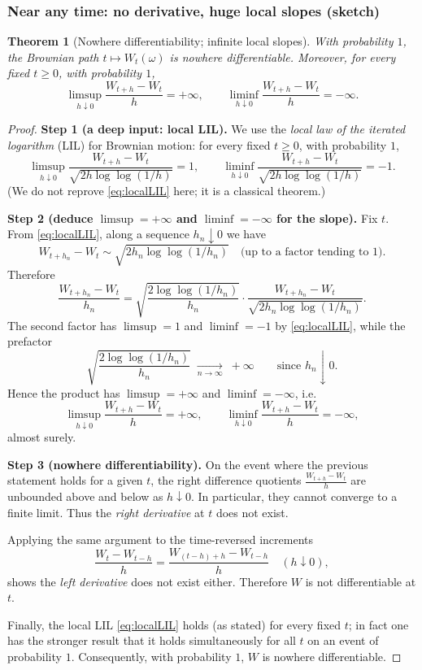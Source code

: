 \documentclass[11pt]{article}
\newtheorem{theorem}{Theorem}[section]
\theoremstyle{definition}
\theoremstyle{remark}
\begin{document}
\subsubsection{Near any time: no derivative, huge local slopes (sketch)}
\begin{theorem}[Nowhere differentiability; infinite local slopes]
With probability $1$, the Brownian path $t\mapsto W_t(\omega)$ is nowhere differentiable.
Moreover, for every fixed $t\ge 0$, with probability $1$,
\[
\limsup_{h\downarrow0}\frac{W_{t+h}-W_t}{h}=+\infty,
\qquad
\liminf_{h\downarrow0}\frac{W_{t+h}-W_t}{h}=-\infty.
\]
\end{theorem}

\begin{proof}
\textbf{Step 1 (a deep input: local LIL).}
We use the \emph{local law of the iterated logarithm} (LIL) for Brownian motion:
for every fixed $t\ge 0$, with probability $1$,
\begin{equation}\label{eq:localLIL}
\limsup_{h\downarrow0}\frac{W_{t+h}-W_t}{\sqrt{2h\log\log(1/h)}}=1,
\qquad
\liminf_{h\downarrow0}\frac{W_{t+h}-W_t}{\sqrt{2h\log\log(1/h)}}=-1.
\end{equation}
(We do not reprove \eqref{eq:localLIL} here; it is a classical theorem.)

\medskip
\textbf{Step 2 (deduce $\limsup=+\infty$ and $\liminf=-\infty$ for the slope).}
Fix $t$. From \eqref{eq:localLIL}, along a sequence $h_n\downarrow0$ we have
\[
W_{t+h_n}-W_t \sim \sqrt{2h_n\log\log(1/h_n)}\quad\text{(up to a factor tending to $1$)}.
\]
Therefore
\[
\frac{W_{t+h_n}-W_t}{h_n}
=
\sqrt{\frac{2\log\log(1/h_n)}{h_n}}\cdot
\frac{W_{t+h_n}-W_t}{\sqrt{2h_n\log\log(1/h_n)}}.
\]
The second factor has $\limsup=1$ and $\liminf=-1$ by \eqref{eq:localLIL}, while the prefactor
\[
\sqrt{\frac{2\log\log(1/h_n)}{h_n}}
\;\xrightarrow[n\to\infty]{}\;+\infty
\qquad\text{since } h_n\downarrow0.
\]
Hence the product has $\limsup=+\infty$ and $\liminf=-\infty$, i.e.
\[
\limsup_{h\downarrow0}\frac{W_{t+h}-W_t}{h}=+\infty,
\qquad
\liminf_{h\downarrow0}\frac{W_{t+h}-W_t}{h}=-\infty,
\]
almost surely.

\medskip
\textbf{Step 3 (nowhere differentiability).}
On the event where the previous statement holds for a given $t$, the right difference quotients
$\frac{W_{t+h}-W_t}{h}$ are unbounded above and below as $h\downarrow0$. In particular,
they cannot converge to a finite limit. Thus the \emph{right derivative} at $t$ does not exist.

Applying the same argument to the time-reversed increments
\[
\frac{W_t-W_{t-h}}{h}
=
\frac{W_{(t-h)+h}-W_{t-h}}{h}
\quad (h\downarrow0),
\]
shows the \emph{left derivative} does not exist either. Therefore $W$ is not differentiable at $t$.

Finally, the local LIL \eqref{eq:localLIL} holds (as stated) for every fixed $t$; in fact one has the stronger
result that it holds simultaneously for all $t$ on an event of probability $1$.
Consequently, with probability $1$, $W$ is nowhere differentiable.
\end{proof}
\end{document}
